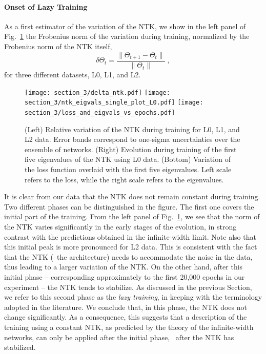 \paragraph{Onset of Lazy Training} 

As a first estimator of the variation of the NTK, we show in the left panel of
Fig.~\ref{fig:NTKTime} the Frobenius norm of the variation during training,
normalized by the Frobenius norm of the NTK itself, 
\begin{equation}
\delta \Theta_t = \frac{\lVert \Theta_{t+1} - \Theta_t \rVert}{\lVert \Theta_t \rVert} \;,
\label{eq:DeltaNTK}
\end{equation}
for three different datasets, L0, L1, and L2. 

\begin{figure}[t]
  \centering
  \texttt{[image: section\_3/delta\_ntk.pdf]}
  \texttt{[image: section\_3/ntk\_eigvals\_single\_plot\_L0.pdf]}
  \texttt{[image: section\_3/loss\_and\_eigvals\_vs\_epochs.pdf]}  
  \caption{(Left) Relative variation of the NTK during training for L0, L1, and L2
  data. Error bands correspond to one-sigma uncertainties over the ensemble of
  networks. (Right) Evolution during training of the first five eigenvalues of the NTK using
  L0 data. (Bottom) Variation of the loss function overlaid with the first five eigenvalues.
  Left scale refers to the loss, while the right scale refers to the eigenvalues.}
  \label{fig:NTKTime}
\end{figure}

It is clear from our data that the NTK does not remain constant during training.
Two different phases can be distinguished in the figure. The first one covers
the initial part of the training. From the left panel of Fig.~\ref{fig:NTKTime},
we see that the norm of the NTK varies significantly in the early stages of the
evolution, in strong contrast with the predictions obtained in the
infinite-width limit. Note also that this initial peak is more pronounced for L2
data. This is consistent with the fact that the NTK (\ie\ the architecture)
needs to accommodate the noise in the data, thus leading to a larger variation
of the NTK. On the other hand, after this initial phase -- corresponding
approximately to the first 20,000 epochs in our experiment -- the NTK tends to
stabilize. As discussed in the previous Section, we refer to this second phase
as the \textit{lazy training}, in keeping with the terminology adopted in the
literature. We conclude that, in this phase, the NTK does not change
significantly. As a consequence, this suggests that a description of the
training using a constant NTK, as predicted by the theory of the infinite-width
networks, can only be applied after the initial phase, \ie\ after the NTK has
stabilized. 

